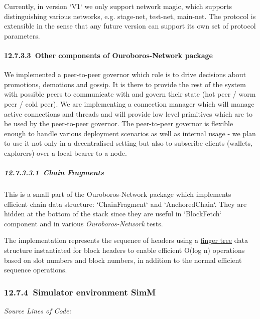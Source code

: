 \documentclass[11pt,a4paper]{article}
\begin{document}
Currently, in version `V1` we only support network magic, which supports
distinguishing various networks, e.g. stage-net, test-net, main-net. The
protocol is extensible in the sense that any future version can support
its own set of protocol parameters.

\hypertarget{other-components-of-ouroboros-network-package}{%
\paragraph{​12.7.3.3​~Other components of Ouroboros-Network
package}\label{other-components-of-ouroboros-network-package}}

We implemented a peer-to-peer governor which role is to drive decisions
about promotions, demotions and gossip. It is there to provide the rest
of the system with possible peers to communicate with and govern their
state (hot peer / worm peer / cold peer). We are implementing a
connection manager which will manage active connections and threads and
will provide low level primitives which are to be used by the
peer-to-peer governor. The peer-to-peer governor is flexible enough to
handle various deployment scenarios as well as internal usage - we plan
to use it not only in a decentralised setting but also to subscribe
clients (wallets, explorers) over a local bearer to a node.

\hypertarget{chain-fragments}{%
\subparagraph{​12.7.3.3.1​~Chain Fragments}\label{chain-fragments}}

This is a small part of the Ouroboros-Network package which implements
efficient chain data structure: `ChainFragment` and `AnchoredChain`.
They are hidden at the bottom of the stack since they are useful in
`BlockFetch` component and in various \emph{Ouroboros-Network} tests.

The implementation represents the sequence of headers using a
\href{http://www.staff.city.ac.uk/~ross/papers/FingerTree.html}{finger
tree} data structure instantiated for block headers to enable efficient
O(log n) operations based on slot numbers and block numbers, in addition
to the normal efficient sequence operations.

\hypertarget{simulator-environment-simm}{%
\subsubsection{​12.7.4​~Simulator environment
SimM}\label{simulator-environment-simm}}

\emph{Source Lines of Code:\\
}
\end{document}
